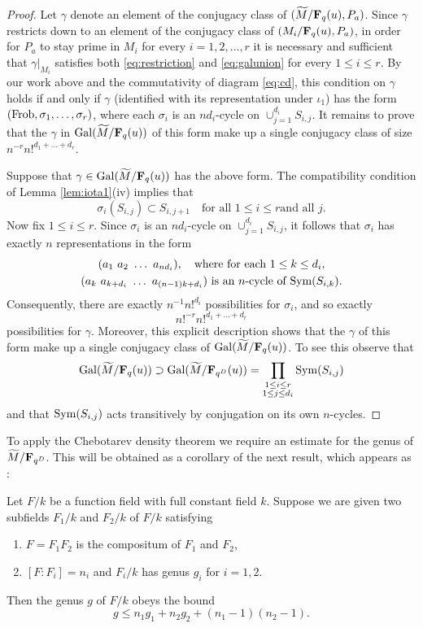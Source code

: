 \documentclass[a4paper]{compositio}
\begin{document}
\begin{proof}
Let $\gamma$ denote an element of the conjugacy class of
$(\widetilde{M}/\mathbf{F}_{q}(u), P_a)$. Since $\gamma$ restricts down to
an element of the conjugacy class of $(M_i/\mathbf{F}_q(u), P_a)$, in order
for $P_a$ to stay prime in $M_i$ for every $i=1, 2, \dots, r$ it is
necessary and sufficient that $\gamma|_{M_i}$ satisfies both
\eqref{eq:restriction} and \eqref{eq:galunion} for every $1\leq i
\leq r$. By our work above and the commutativity of diagram
\eqref{eq:cd}, this condition on $\gamma$ holds if and only if
$\gamma$ (identified with its representation under $\iota_1$) has
the form $(\mathrm{Frob}, \sigma_1, \dots, \sigma_r)$, where each $\sigma_i$
is an $nd_i$-cycle on $\cup_{j=1}^{d_i}S_{i,j}$. It remains to prove
that the $\gamma $ in $\mathrm{Gal}(\widetilde{M}/\mathbf{F}_{q}(u))$ of this form
make up a single conjugacy class of size $n^{-r} n!^{d_1 + \dots +
d_r}$.

Suppose that $\gamma \in \mathrm{Gal}(\widetilde{M}/\mathbf{F}_{q}(u))$ has the
above form. The compatibility condition of Lemma \ref{lem:iota1}(iv)
implies that
\[ \sigma_i(S_{i,j}) \subset S_{i, j+1} \quad \text{for all $1\leq i \leq r$
and all $j$}. \] Now fix $1 \leq i \leq r$. Since $\sigma_i$ is an
$nd_i$-cycle on $\cup_{j=1}^{d_i}S_{i,j}$, it follows that
$\sigma_i$ has exactly $n$ representations in the form
\begin{multline*} (a_1~a_2~\dots~a_{n d_i}), \quad\text{where for each
$1 \leq k \leq d_i$}, \\ (a_k~a_{k+d_i}~\dots~a_{(n-1)k+d_i}) \text{
is an $n$-cycle of $\mathrm{Sym}(S_{i,k})$}. \end{multline*} Consequently,
there are exactly $n^{-1} n!^{d_i}$ possibilities for $\sigma_i$,
and so exactly
\[n!^{-r} n!^{d_1 + \dots + d_r}\]  possibilities for $\gamma$.
Moreover, this explicit description shows that the $\gamma$ of this
form make up a single conjugacy class of
$\mathrm{Gal}(\widetilde{M}/\mathbf{F}_q(u))$. To see this observe that
\[ \mathrm{Gal}(\widetilde{M}/\mathbf{F}_q(u)) \supset \mathrm{Gal}(\widetilde{M}/\mathbf{F}_{q^D}(u)) = \prod_{\substack{1 \leq i \leq r \\ 1 \leq j \leq d_i}}
\mathrm{Sym}(S_{i,j})
\] and that $\mathrm{Sym}(S_{i,j})$ acts transitively by conjugation on its own
$n$-cycles.
\end{proof}

To apply the Chebotarev density theorem we require an estimate for
the genus of $\widetilde{M}/\mathbf{F}_{q^D}$. This will be obtained as a
corollary of the next result, which appears as \cite[Theorem
III.10.3]{stichtenoth93}:

\begin{cast} Let $F/k$ be a function field with full constant field
$k$. Suppose we are given two subfields $F_1/k$ and $F_2/k$ of $F/k$
satisfying
\begin{enumerate}
\item $F = F_1 F_2$ is the compositum of $F_1$ and $F_2$,
\item $[F: F_i] = n_i$ and $F_i/k$ has genus $g_i$ for $i=1, 2$.
\end{enumerate}
Then the genus $g$ of $F/k$ obeys the bound
\[ g \leq n_1 g_1 + n_2 g_2 + (n_1 -1)(n_2-1). \]
\end{cast}
\end{document}
